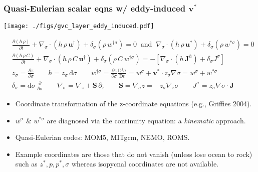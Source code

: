 \documentclass[10pt]{beamer}
\begin{document}
\begin{frame}
  \frametitle{Quasi-Eulerian scalar eqns w/ eddy-induced ${\bm v}^{*}$}

\begin{center}
\vspace{-.3cm}
{\texttt{[image: ./figs/gvc\_layer\_eddy\_induced.pdf]}}
\end{center}
\vspace{-.5cm}

\begin{align}
  &\frac{\partial (h \, \rho)}{\partial  t} + \nabla_{\sigma} \cdot (h \, \rho \, {\bm u}^{\dagger} ) 
 + \delta_{\sigma} (\rho \, w^{\dagger \sigma} ) 
 = 0 
 \; \; \mbox{and} \; \; \nabla_{\sigma} \cdot ( h \, \rho \, {\bm u}^{*})  + \delta_{\sigma} (\rho \, w^{*\sigma} ) = 0 
\\
  &\frac{\partial (h \, \rho \, C)}{\partial  t} + \nabla_{\sigma} \cdot (h \, \rho \, C \, {\bm u}^{\dagger} ) 
 + \delta_{\sigma} (\rho \, C \, w^{\dagger \sigma} ) 
 =
 -\left[  \nabla_{\sigma} \cdot ( h \, {\bm J}^{h}) +  \delta_{\sigma} J^{\sigma} \right] 
 \\
  &z_{\sigma} = \frac{\partial z}{\partial \sigma} 
  \qquad h = z_{\sigma} \, \mathrm{d}\sigma 
  \qquad w^{\dagger \sigma} =  \frac{\partial z}{\partial \sigma}  \frac{ \mathrm{D}^{\dagger} \sigma}{\mathrm{D}t} 
  = w^{\sigma} + {\bm v}^{*}\cdot z_{\sigma} \nabla \sigma = w^{\sigma}  + w^{*\sigma} 
 \\
 &\delta_{\sigma} = \mathrm{d}\sigma \, \frac{\partial}{\partial \sigma}
 \qquad \nabla_{\sigma} = \nabla_{z} + {\bm S} \, \partial_{z}
 \qquad {\bm S}  = \nabla_{\sigma} z = -z_{\sigma}  \nabla_{z}\sigma
 \qquad J^{\sigma}  = z_{\sigma}  \nabla \sigma  \cdot {\bm J} 
\label{eq:gvc-mass-tracer-equation}
\end{align}

\begin{exampleblock}{}
\begin{itemize}
\item Coordinate transformation of the z-coordinate equations (e.g., Griffies 2004).  
\item $w^{\sigma}$ \& $w^{*\sigma} $ are diagnosed via the continuity
  equation: a {\it kinematic} approach.
\item Quasi-Eulerian codes: MOM5, MITgcm, NEMO, ROMS.
\item Example coordinates are those that do not vanish (unless lose
  ocean to rock) such as $z^{*},p,p^{*},\sigma$ whereas isopycnal coordinates are not available. 
\end{itemize}
\end{exampleblock}{}

\end{frame}
\end{document}

